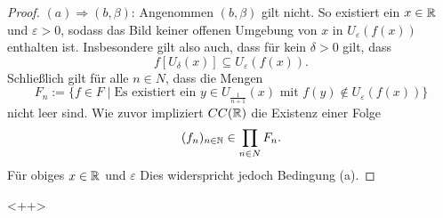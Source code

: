 \begin{proof}
  $(a) \Rightarrow (b,\beta)$:
  Angenommen $(b, \beta)$ gilt nicht.
  So existiert ein $x \in \mathbb{R}$ und $\varepsilon > 0$, sodass das Bild keiner offenen Umgebung von $x$ in $U_\varepsilon(f(x))$ enthalten ist.
  Insbesondere gilt also auch, dass für kein $\delta > 0$ gilt, dass
  \begin{displaymath}
    f[U_\delta(x)] \subseteq U_\varepsilon(f(x)).
  \end{displaymath}
  Schließlich gilt für alle $n \in N$, dass die Mengen
  \begin{displaymath}
    F_n := \{ f \in F \mid \text{Es existiert ein } y \in U_{\frac{1}{n+1}}(x) \text{ mit } f(y) \not\in U_\varepsilon(f(x)) \}
  \end{displaymath}
  nicht leer sind.
  Wie zuvor impliziert $CC(\mathbb{R})$ die Existenz einer Folge 
  \begin{displaymath}
    (f_n)_{n \in \mathbb{N}} \in \prod_{n \in N} F_n.
  \end{displaymath}
  Für obiges $x \in \mathbb{R}$ und $\varepsilon$ 
  Dies widerspricht jedoch Bedingung (a).
\end{proof}<++>
